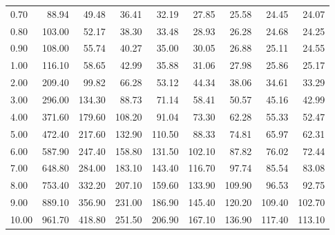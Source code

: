 \begin{tabular}{lrrrrrrrr}
0.70  &    88.94 &     49.48 &      36.41 &        32.19 &      27.85 &     25.58 &     24.45 &        24.07 \\
0.80  &   103.00 &     52.17 &      38.30 &        33.48 &      28.93 &     26.28 &     24.68 &        24.25 \\
0.90  &   108.00 &     55.74 &      40.27 &        35.00 &      30.05 &     26.88 &     25.11 &        24.55 \\
1.00  &   116.10 &     58.65 &      42.99 &        35.88 &      31.06 &     27.98 &     25.86 &        25.17 \\
2.00  &   209.40 &     99.82 &      66.28 &        53.12 &      44.34 &     38.06 &     34.61 &        33.29 \\
3.00  &   296.00 &    134.30 &      88.73 &        71.14 &      58.41 &     50.57 &     45.16 &        42.99 \\
4.00  &   371.60 &    179.60 &     108.20 &        91.04 &      73.30 &     62.28 &     55.33 &        52.47 \\
5.00  &   472.40 &    217.60 &     132.90 &       110.50 &      88.33 &     74.81 &     65.97 &        62.31 \\
6.00  &   587.90 &    247.40 &     158.80 &       131.50 &     102.10 &     87.82 &     76.02 &        72.44 \\
7.00  &   648.80 &    284.00 &     183.10 &       143.40 &     116.70 &     97.74 &     85.54 &        83.08 \\
8.00  &   753.40 &    332.20 &     207.10 &       159.60 &     133.90 &    109.90 &     96.53 &        92.75 \\
9.00  &   889.10 &    356.90 &     231.00 &       186.90 &     145.40 &    120.20 &    109.40 &       102.70 \\
10.00 &   961.70 &    418.80 &     251.50 &       206.90 &     167.10 &    136.90 &    117.40 &       113.10 \\
\bottomrule
\end{tabular}
